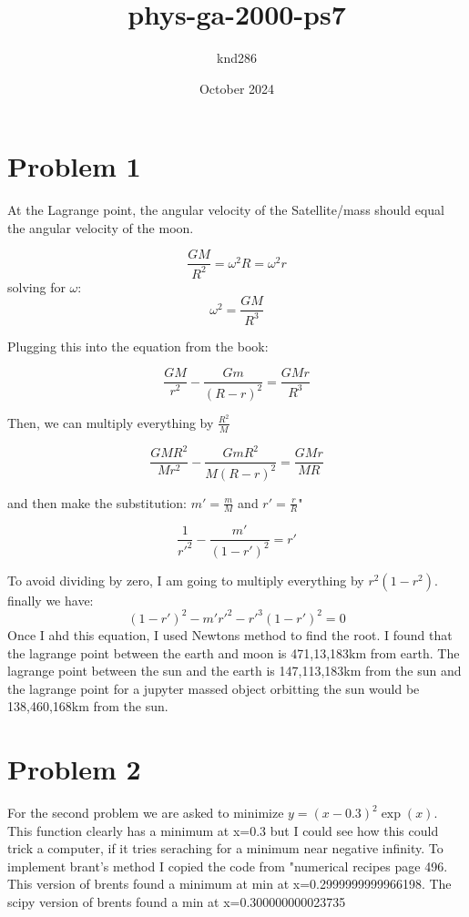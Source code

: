 \documentclass{article}
\title{phys-ga-2000-ps7}
\author{knd286 }
\date{October 2024}
\begin{document}
\maketitle

\section{Problem 1}
At the Lagrange point, the angular velocity of the Satellite/mass should equal the angular velocity of the moon. 

\begin{equation}
    \frac{GM}{R^2}=\omega^2R=\omega^2r
\end{equation}
solving for $\omega$:
\begin{equation}
    \omega^2=\frac{GM}{R^3}
\end{equation}

Plugging this into the equation from the book:

\begin{equation}
    \frac{GM}{r^2}-\frac{Gm}{(R-r)^2}=\frac{GMr}{R^3}
\end{equation}

Then, we can multiply everything by $\frac{R^2}{M}$

\begin{equation}
    \frac{GMR^2}{Mr^2}-\frac{GmR^2}{M(R-r)^2}=\frac{GMr}{MR}
\end{equation}

and then make the substitution: $m'=\frac{m}{M}$ and $r'=\frac{r}{R}$"

\begin{equation}
    \frac{1}{r'^2}-\frac{m'}{(1-r')^2}=r'
\end{equation}

To avoid dividing by zero, I am going to multiply everything by $r^2(1-r^2)$. finally we have:
\begin{equation}
    (1-r')^2-m'r'^2-r'^3(1-r')^2=0
\end{equation}
Once I ahd this equation, I used Newtons method to find the root. 
I found that the lagrange point between the earth and moon is 471,13,183km from earth. The lagrange point between the sun and the earth is 147,113,183km from the sun and the lagrange point for a jupyter massed object orbitting the sun would be 138,460,168km from the sun.

\section{Problem 2}
For the second problem we are asked to minimize $y =(x - 0.3)^2 \exp(x)$. This function clearly has a minimum at x=0.3 but I could see how this could trick a computer, if it tries seraching for a minimum near negative infinity. To implement brant's method I copied the code from "numerical recipes page 496. This version of brents found a minimum at min at x=0.2999999999966198. The scipy version of brents found a min at x=0.300000000023735
\end{document}

